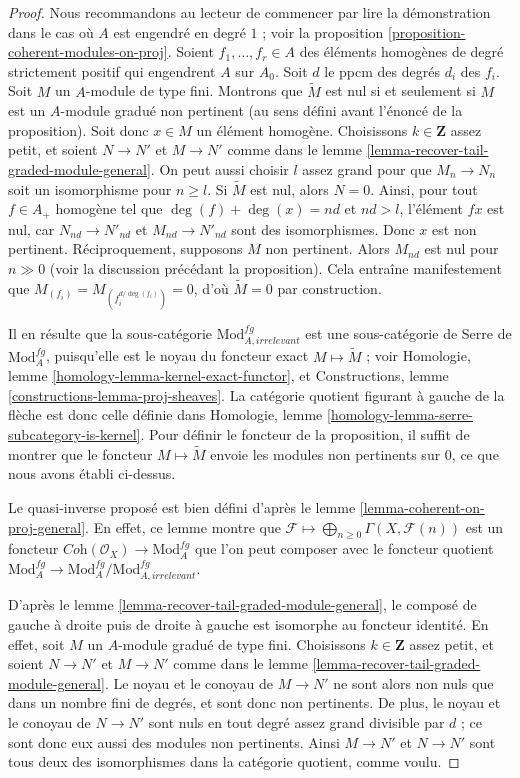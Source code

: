 \begin{proof}
Nous recommandons au lecteur de commencer par lire la démonstration dans le cas où $A$
est engendré en degré $1$ ; voir la
proposition \ref{proposition-coherent-modules-on-proj}.
Soient $f_1, \ldots, f_r \in A$ des éléments homogènes de degré strictement positif
qui engendrent $A$ sur $A_0$. Soit $d$ le ppcm des degrés
$d_i$ des $f_i$. Soit $M$ un $A$-module
de type fini. Montrons que $\widetilde{M}$ est nul si et
seulement si $M$ est un $A$-module gradué non pertinent (au
sens défini avant l'énoncé de la proposition). Soit donc $x \in M$ un élément
homogène.
Choisissons $k \in \mathbf{Z}$ assez petit, et soient
$N \to N'$ et $M \to N'$ comme dans le
lemme \ref{lemma-recover-tail-graded-module-general}.
On peut aussi choisir $l$ assez grand pour que
$M_n \to N_n$ soit un isomorphisme pour $n \geq l$.
Si $\widetilde{M}$ est nul, alors $N = 0$.
Ainsi, pour tout $f \in A_+$ homogène tel que
$\deg(f) + \deg(x) = nd$ et $nd > l$, l'élément $fx$ est nul,
car $N_{nd} \to N'_{nd}$ et $M_{nd} \to N'_{nd}$ sont des isomorphismes.
Donc $x$ est non
pertinent. Réciproquement, supposons $M$ non pertinent. Alors $M_{nd}$ est nul
pour $n \gg 0$ (voir la discussion précédant la
proposition). Cela entraîne manifestement que $M_{(f_i)} = M_{(f_i^{d/\deg(f_i)})} = 0$,
d'où $\widetilde{M} = 0$ par construction.

\medskip\noindent
Il en résulte que la sous-catégorie $\text{Mod}^{fg}_{A, irrelevant}$
est une sous-catégorie de Serre de $\text{Mod}^{fg}_A$, puisqu'elle est
le noyau du foncteur exact $M \mapsto \widetilde M$ ; voir
Homologie, lemme \ref{homology-lemma-kernel-exact-functor},
et Constructions, lemme \ref{constructions-lemma-proj-sheaves}.
La catégorie quotient figurant à gauche de la flèche est donc celle définie
dans Homologie, lemme \ref{homology-lemma-serre-subcategory-is-kernel}.
Pour définir le foncteur de la proposition, il suffit de montrer que
le foncteur $M \mapsto \widetilde M$ envoie les modules non pertinents sur $0$,
ce que nous avons établi ci-dessus.

\medskip\noindent
Le quasi-inverse proposé est bien défini d'après le lemme \ref{lemma-coherent-on-proj-general}. En
effet, ce lemme montre que
$\mathcal{F} \longmapsto \bigoplus_{n \geq 0} \Gamma(X, \mathcal{F}(n))$
est un foncteur $\textit{Coh}(\mathcal{O}_X) \to \text{Mod}^{fg}_A$
que l'on peut composer avec le foncteur quotient
$\text{Mod}^{fg}_A \to \text{Mod}^{fg}_A/\text{Mod}^{fg}_{A, irrelevant}$.

\medskip\noindent
D'après le lemme \ref{lemma-recover-tail-graded-module-general},
le composé de gauche à droite puis de droite à gauche est isomorphe au foncteur identité.
En effet, soit $M$ un $A$-module gradué de type fini. Choisissons
$k \in \mathbf{Z}$ assez petit, et soient
$N \to N'$ et $M \to N'$ comme dans le
lemme \ref{lemma-recover-tail-graded-module-general}.
Le noyau et le conoyau de $M \to N'$ ne sont alors non
nuls que dans un nombre fini de degrés, et sont donc non pertinents.
De plus, le noyau et le conoyau de $N \to N'$ sont nuls en tout degré
assez grand divisible par $d$ ; ce sont donc eux aussi des modules non pertinents.
Ainsi $M \to N'$ et $N \to N'$ sont tous deux des isomorphismes dans la
catégorie quotient, comme voulu.


\end{proof}
